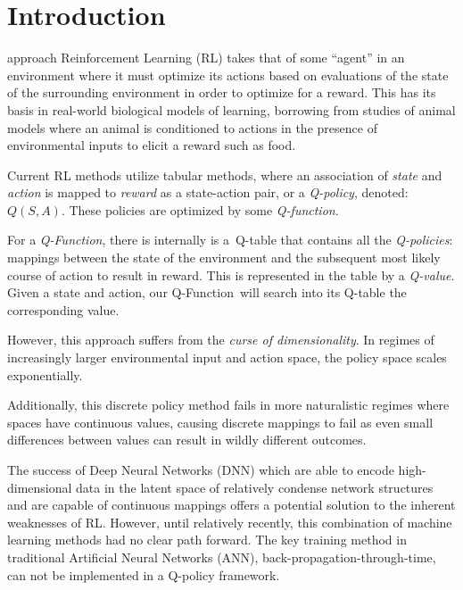 \documentclass[journal,onecolumn]{IEEEtran}
\begin{document}
\section{Introduction}
% 
% 
% 
% 
 approach Reinforcement Learning (RL) takes that of some ``agent'' in
an environment where it must optimize its actions based on evaluations of the state of the surrounding environment in order to optimize for a reward. This has its
basis in real-world biological models of learning, borrowing from
studies of animal models where an animal is conditioned to actions in
the presence of environmental inputs to elicit a reward such as food.

Current RL methods utilize tabular methods, where an association of
\emph{state} and \emph{action} is mapped to \emph{reward} as a
state-action pair, or a \emph{Q-policy}, denoted: \(Q(S, A)\). These
policies are optimized by some \emph{Q-function}.

For a \emph{Q-Function}, there is internally is a~Q-table that contains
all the \emph{Q-policies}: mappings between the state of the environment
and the subsequent most likely course of action to result in reward.
This is represented in the table by a \emph{Q-value}. Given a state and
action, our Q-Function~will search into its Q-table the corresponding
value.

However, this approach suffers from the \emph{curse of dimensionality}. In
regimes of increasingly larger environmental input and action space, the
policy space scales exponentially.

Additionally, this discrete policy method fails in more naturalistic
regimes where spaces have continuous values, causing
discrete mappings to fail as even small differences between values can
result in wildly different outcomes.

The success of Deep Neural Networks (DNN) which are able to encode
high-dimensional data in the latent space of relatively condense network
structures and are capable of continuous mappings offers a potential
solution to the inherent weaknesses of RL. However, until relatively recently, this combination of
machine learning methods had no clear path forward. The key training method in traditional Artificial Neural Networks (ANN), back-propagation-through-time, can not be implemented in
a Q-policy framework.
\end{document}
